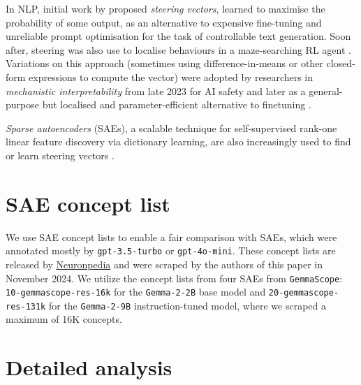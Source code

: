 \documentclass{article}
\theoremstyle{plain}
\theoremstyle{definition}
\theoremstyle{remark}
\renewcommand{\cite}{\citep}
\begin{document}
In NLP, initial work by \citet{subramani-etal-2022-extracting} proposed \textit{steering vectors}, learned to maximise the probability of some output, as an alternative to expensive fine-tuning and unreliable prompt optimisation for the task of controllable text generation. Soon after, steering was also use to localise behaviours in a maze-searching RL agent \citep{turner2023,turner2023b,mini2023understandingcontrollingmazesolvingpolicy}. Variations on this approach (sometimes using difference-in-means or other closed-form expressions to compute the vector) were adopted by researchers in \textit{mechanistic interpretability} from late 2023 for AI safety \cite{zou2023representationengineeringtopdownapproach,liInferenceTimeInterventionEliciting2024,turner2024steeringlanguagemodelsactivation,marks2024geometrytruthemergentlinear,rimsky-etal-2024-steering} and later as a general-purpose but localised and parameter-efficient alternative to finetuning \cite{wu2024reft,liu2024incontext,vanderweij2024extendingactivationsteeringbroad}.

\textit{Sparse autoencoders} (SAEs), a scalable technique for self-supervised rank-one linear feature discovery via dictionary learning, are also increasingly used to find or learn steering vectors \cite{templeton2024scaling,chalnev2024improvingsteeringvectorstargeting,makelov2024sparse,obrien2024steeringlanguagemodelrefusal}.

\section{SAE concept list}\label{sec:sae-concept-list}

We use SAE concept lists to enable a fair comparison with SAEs, which were annotated mostly by \texttt{gpt-3.5-turbo} or \texttt{gpt-4o-mini}. These concept lists are released by \href{https://www.neuronpedia.org/}{Neuronpedia} and were scraped by the authors of this paper in November 2024. We utilize the concept lists from four SAEs from \texttt{GemmaScope}: \texttt{10-gemmascope-res-16k} for the \texttt{Gemma-2-2B} base model and \texttt{20-gemmascope-res-131k} for the \texttt{Gemma-2-9B} instruction-tuned model, where we scraped a maximum of 16K concepts.

\clearpage

\section{Detailed analysis}\label{sec:detail-result-analysis}
\end{document}
